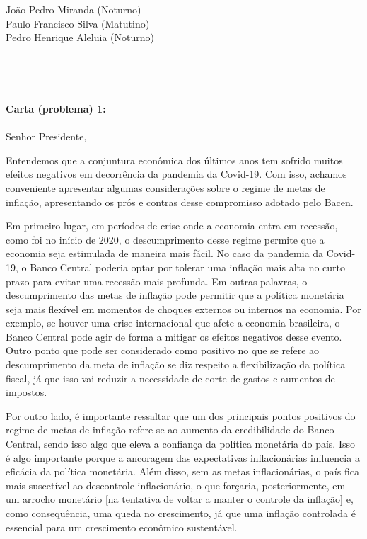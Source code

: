 \documentclass[11pt,a4paper]{letter} %
\def\opening#1{\thispagestyle{empty}
{\centering\fromaddress \vspace{0.6in} \\ %
\hspace*{\longindentation}\hspace*{\fill}\par} %
{\raggedright \toname \\ \toaddress \par} %
\vspace{0.4in} %
\noindent #1 %
}
\begin{document}

\begin{letter}
{João Pedro Miranda (Noturno)\\
\vspace{0.8pt}
Paulo Francisco Silva (Matutino) \\
\vspace{0.8pt}
Pedro Henrique Aleluia (Noturno)\\
}

\opening{\textbf{Carta (problema) 1:}\\\\
Senhor Presidente,}

Entendemos que a conjuntura econômica dos últimos anos tem sofrido muitos efeitos negativos em decorrência da pandemia da Covid-19. Com isso, achamos conveniente apresentar algumas considerações sobre o regime de metas de inflação, apresentando os prós e contras desse compromisso adotado pelo Bacen.

Em primeiro lugar, em períodos de crise onde a economia entra em recessão, como foi no início de 2020, o descumprimento desse regime permite que a economia seja estimulada de maneira mais fácil. No caso da pandemia da Covid-19, o Banco Central poderia optar por tolerar uma inflação mais alta no curto prazo para evitar uma recessão mais profunda. Em outras palavras, o descumprimento das metas de inflação pode permitir que a política monetária seja mais flexível em momentos de choques externos ou internos na economia. Por exemplo, se houver uma crise internacional que afete a economia brasileira, o Banco Central pode agir de forma a mitigar os efeitos negativos desse evento.
Outro ponto que pode ser considerado como positivo no que se refere ao descumprimento da meta de inflação se diz respeito a flexibilização da política fiscal, já que isso vai reduzir a necessidade de corte de gastos e aumentos de impostos.
 
Por outro lado, é importante ressaltar que um dos principais pontos positivos do regime de metas de inflação refere-se ao aumento da credibilidade do Banco Central, sendo isso algo que eleva a confiança da política monetária do país. Isso é algo importante porque a ancoragem das expectativas inflacionárias influencia a eficácia da política monetária.
Além disso, sem as metas inflacionárias, o país fica mais suscetível ao descontrole inflacionário, o que forçaria, posteriormente, em um arrocho monetário [na tentativa de voltar a manter o controle da inflação] e, como consequência, uma queda no crescimento, já que uma inflação controlada é essencial para um crescimento econômico sustentável.


\end{letter}
\end{document}
